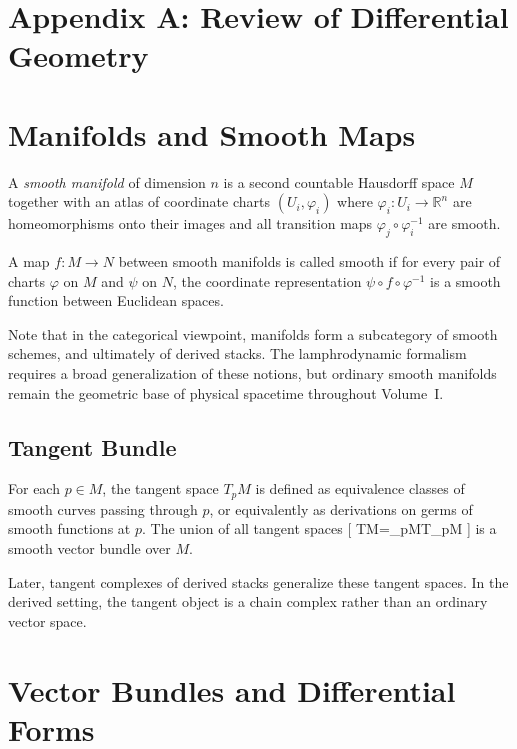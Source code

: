 \appendix

\section*{Appendix A: Review of Differential Geometry}

\section{Manifolds and Smooth Maps}

A \emph{smooth manifold} of dimension $n$ is a second countable Hausdorff space $M$ together with an atlas of coordinate charts ${(U_i,\varphi_i)}$ where $\varphi_i\colon U_i\to\mathbb{R}^n$ are homeomorphisms onto their images and all transition maps $\varphi_j\circ\varphi_i^{-1}$ are smooth.

\begin{definition}
A map $f\colon M\to N$ between smooth manifolds is called smooth if for every pair of charts $\varphi$ on $M$ and $\psi$ on $N$, the coordinate representation $\psi\circ f\circ\varphi^{-1}$ is a smooth function between Euclidean spaces.
\end{definition}

Note that in the categorical viewpoint, manifolds form a subcategory of smooth schemes, and ultimately of derived stacks.  The lamphrodynamic formalism requires a broad generalization of these notions, but ordinary smooth manifolds remain the geometric base of physical spacetime throughout Volume~I.

\subsection{Tangent Bundle}

For each $p\in M$, the tangent space $T_pM$ is defined as equivalence classes of smooth curves passing through $p$, or equivalently as derivations on germs of smooth functions at $p$.  The union of all tangent spaces
[
TM=\bigsqcup_{p\in M}T_pM
]
is a smooth vector bundle over $M$.

\begin{remark}
Later, tangent complexes of derived stacks generalize these tangent spaces.  In the derived setting, the tangent object is a chain complex rather than an ordinary vector space.
\end{remark}

\section{Vector Bundles and Differential Forms}

